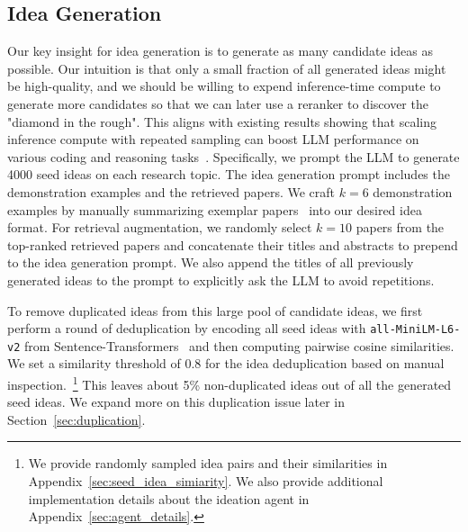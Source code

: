 \subsection{Idea Generation}
Our key insight for idea generation is to generate as many candidate ideas as possible. Our intuition is that only a small fraction of all generated ideas might be high-quality, and we should be willing to expend inference-time compute to generate more candidates so that we can later use a reranker to discover the "diamond in the rough". This aligns with existing results showing that scaling inference compute with repeated sampling can boost LLM performance on various coding and reasoning tasks~\cite{Li2022CompetitionlevelCG,Brown2024LargeLM}. 
Specifically, we prompt the LLM to generate 4000 seed ideas on each research topic. The idea generation prompt includes the demonstration examples and the retrieved papers. 
We craft $k = 6$ demonstration examples by manually summarizing exemplar papers~\cite{Yasunaga2023LargeLM,Madaan2023SelfRefineIR,Weller2023AccordingT,Weston2023System2A,Zheng2023TakeAS,Dhuliawala2023ChainofVerificationRH} into our desired idea format.
For retrieval augmentation, we randomly select $k = 10$ papers from the top-ranked retrieved papers and concatenate their titles and abstracts to prepend to the idea generation prompt. 
We also append the titles of all previously generated ideas to the prompt to explicitly ask the LLM to avoid repetitions. 

%
%
To remove duplicated ideas from this large pool of candidate ideas, we first perform a round of deduplication by encoding all seed ideas with \texttt{all-MiniLM-L6-v2} from Sentence-Transformers~\cite{reimers-2020-multilingual-sentence-bert} and then computing pairwise cosine similarities. We set a similarity threshold of 0.8 for the idea deduplication based on manual inspection.~\footnote{We provide randomly sampled idea pairs and their similarities in Appendix~\ref{sec:seed_idea_simiarity}. We also provide additional implementation details about the ideation agent in Appendix~\ref{sec:agent_details}.}
This leaves about 5\% non-duplicated ideas out of all the generated seed ideas. We expand more on this duplication issue later in Section~\ref{sec:duplication}. 



